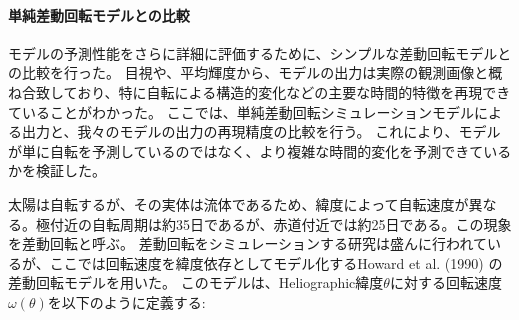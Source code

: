         \paragraph{単純差動回転モデルとの比較}
          モデルの予測性能をさらに詳細に評価するために、シンプルな差動回転モデルとの比較を行った。
          目視や、平均輝度から、モデルの出力は実際の観測画像と概ね合致しており、特に自転による構造的変化などの主要な時間的特徴を再現できていることがわかった。
          ここでは、単純差動回転シミュレーションモデルによる出力と、我々のモデルの出力の再現精度の比較を行う。
          これにより、モデルが単に自転を予測しているのではなく、より複雑な時間的変化を予測できているかを検証した。

          太陽は自転するが、その実体は流体であるため、緯度によって自転速度が異なる。極付近の自転周期は約35日であるが、赤道付近では約25日である。この現象を差動回転と呼ぶ。
          差動回転をシミュレーションする研究は盛んに行われているが、ここでは回転速度を緯度依存としてモデル化するHoward et al. (1990) \cite{howard1990solar}の差動回転モデルを用いた。
          このモデルは、Heliographic緯度\(\theta\)に対する回転速度\(\omega(\theta)\)を以下のように定義する:
          
